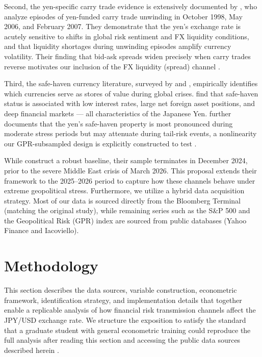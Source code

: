 \documentclass[12pt]{article}
\begin{document}
{} Second, the yen-specific carry trade evidence is extensively documented by \textcite{gagnon2007carry}, who analyze episodes of yen-funded carry trade unwinding in October 1998, May 2006, and February 2007. They demonstrate that the yen's exchange rate is acutely sensitive to shifts in global risk sentiment and FX liquidity conditions, and that liquidity shortages during unwinding episodes amplify currency volatility. Their finding that bid-ask spreads widen precisely when carry trades reverse motivates our inclusion of the FX liquidity (spread) channel \parencite{gagnon2007carry}.

{} Third, the safe-haven currency literature, surveyed by \textcite{habib2012getting} and \textcite{lee2017safe}, empirically identifies which currencies serve as stores of value during global crises. \textcite{habib2012getting} find that safe-haven status is associated with low interest rates, large net foreign asset positions, and deep financial markets --- all characteristics of the Japanese Yen. \textcite{lee2017safe} further documents that the yen's safe-haven property is most pronounced during moderate stress periods but may attenuate during tail-risk events, a nonlinearity our GPR-subsampled design is explicitly constructed to test \parencite{habib2012getting, lee2017safe}.

{} While \textcite{guyot2026risk} construct a robust baseline, their sample terminates in December 2024, prior to the severe Middle East crisis of March 2026. This proposal extends their framework to the 2025--2026 period to capture how these channels behave under extreme geopolitical stress. Furthermore, we utilize a hybrid data acquisition strategy. Most of our data is sourced directly from the Bloomberg Terminal (matching the original study), while remaining series such as the S\&P 500 and the Geopolitical Risk (GPR) index are sourced from public databases (Yahoo Finance and Iacoviello).

\section{Methodology}

{} This section describes the data sources, variable construction, econometric framework, identification strategy, and implementation details that together enable a replicable analysis of how financial risk transmission channels affect the JPY/USD exchange rate. We structure the exposition to satisfy the standard that a graduate student with general econometric training could reproduce the full analysis after reading this section and accessing the public data sources described herein \parencite{rossi2013exchange}.
\end{document}
